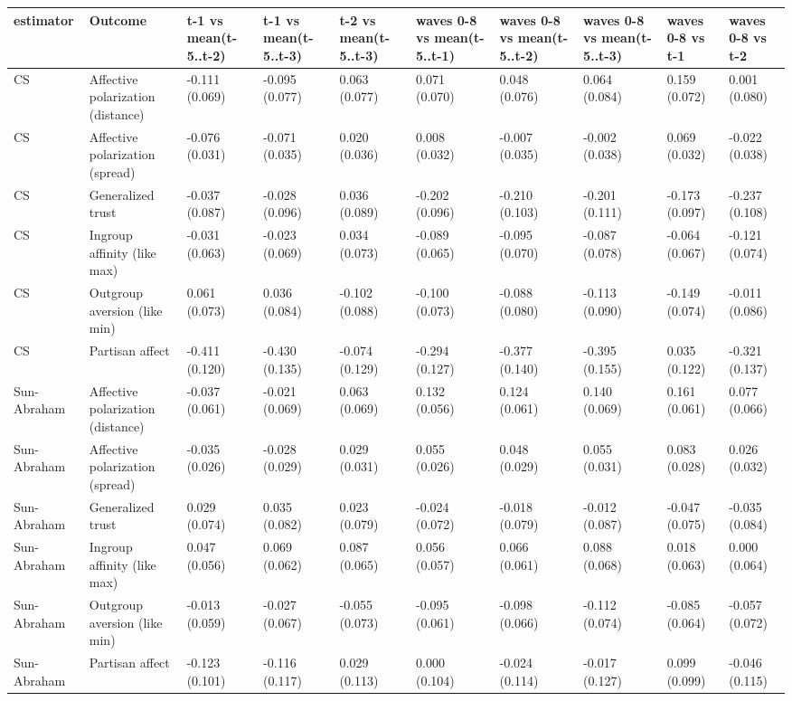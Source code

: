 
\begin{tabular}{llllllllll}
\toprule
estimator & Outcome & t-1 vs mean(t-5..t-2) & t-1 vs mean(t-5..t-3) & t-2 vs mean(t-5..t-3) & waves 0-8 vs mean(t-5..t-1) & waves 0-8 vs mean(t-5..t-2) & waves 0-8 vs mean(t-5..t-3) & waves 0-8 vs t-1 & waves 0-8 vs t-2\\
\midrule
CS & Affective polarization (distance) & -0.111 (0.069) & -0.095 (0.077) & 0.063 (0.077) & 0.071 (0.070) & 0.048 (0.076) & 0.064 (0.084) & 0.159 (0.072) & 0.001 (0.080)\\
CS & Affective polarization (spread) & -0.076 (0.031) & -0.071 (0.035) & 0.020 (0.036) & 0.008 (0.032) & -0.007 (0.035) & -0.002 (0.038) & 0.069 (0.032) & -0.022 (0.038)\\
CS & Generalized trust & -0.037 (0.087) & -0.028 (0.096) & 0.036 (0.089) & -0.202 (0.096) & -0.210 (0.103) & -0.201 (0.111) & -0.173 (0.097) & -0.237 (0.108)\\
CS & Ingroup affinity (like max) & -0.031 (0.063) & -0.023 (0.069) & 0.034 (0.073) & -0.089 (0.065) & -0.095 (0.070) & -0.087 (0.078) & -0.064 (0.067) & -0.121 (0.074)\\
CS & Outgroup aversion (like min) & 0.061 (0.073) & 0.036 (0.084) & -0.102 (0.088) & -0.100 (0.073) & -0.088 (0.080) & -0.113 (0.090) & -0.149 (0.074) & -0.011 (0.086)\\
CS & Partisan affect & -0.411 (0.120) & -0.430 (0.135) & -0.074 (0.129) & -0.294 (0.127) & -0.377 (0.140) & -0.395 (0.155) & 0.035 (0.122) & -0.321 (0.137)\\
Sun-Abraham & Affective polarization (distance) & -0.037 (0.061) & -0.021 (0.069) & 0.063 (0.069) & 0.132 (0.056) & 0.124 (0.061) & 0.140 (0.069) & 0.161 (0.061) & 0.077 (0.066)\\
Sun-Abraham & Affective polarization (spread) & -0.035 (0.026) & -0.028 (0.029) & 0.029 (0.031) & 0.055 (0.026) & 0.048 (0.029) & 0.055 (0.031) & 0.083 (0.028) & 0.026 (0.032)\\
Sun-Abraham & Generalized trust & 0.029 (0.074) & 0.035 (0.082) & 0.023 (0.079) & -0.024 (0.072) & -0.018 (0.079) & -0.012 (0.087) & -0.047 (0.075) & -0.035 (0.084)\\
Sun-Abraham & Ingroup affinity (like max) & 0.047 (0.056) & 0.069 (0.062) & 0.087 (0.065) & 0.056 (0.057) & 0.066 (0.061) & 0.088 (0.068) & 0.018 (0.063) & 0.000 (0.064)\\
Sun-Abraham & Outgroup aversion (like min) & -0.013 (0.059) & -0.027 (0.067) & -0.055 (0.073) & -0.095 (0.061) & -0.098 (0.066) & -0.112 (0.074) & -0.085 (0.064) & -0.057 (0.072)\\
Sun-Abraham & Partisan affect & -0.123 (0.101) & -0.116 (0.117) & 0.029 (0.113) & 0.000 (0.104) & -0.024 (0.114) & -0.017 (0.127) & 0.099 (0.099) & -0.046 (0.115)\\
\bottomrule
\end{tabular}
